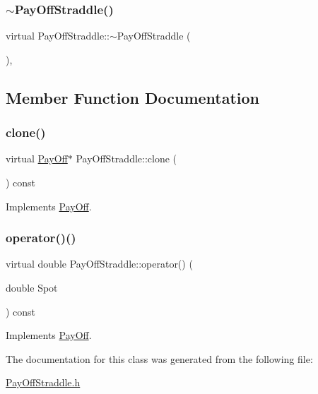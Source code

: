 \subsubsection{\texorpdfstring{$\sim$\+Pay\+Off\+Straddle()}{~PayOffStraddle()}}
{\footnotesize\ttfamily virtual Pay\+Off\+Straddle\+::$\sim$\+Pay\+Off\+Straddle (\begin{DoxyParamCaption}{ }\end{DoxyParamCaption})\hspace{0.3cm}{\ttfamily [inline]}, {\ttfamily [virtual]}}



\subsection{Member Function Documentation}
\hypertarget{classPayOffStraddle_a7909db1ef33e12454c02d289d39f667a}{}\label{classPayOffStraddle_a7909db1ef33e12454c02d289d39f667a} 
\subsubsection{\texorpdfstring{clone()}{clone()}}
{\footnotesize\ttfamily virtual \hyperlink{classPayOff}{Pay\+Off}$\ast$ Pay\+Off\+Straddle\+::clone (\begin{DoxyParamCaption}{ }\end{DoxyParamCaption}) const\hspace{0.3cm}{\ttfamily [virtual]}}



Implements \hyperlink{classPayOff_ad8194d5b82247ae89c25c515f0ba806a}{Pay\+Off}.

\hypertarget{classPayOffStraddle_a28143540c0f8f858d8c00aaea188f4c1}{}\label{classPayOffStraddle_a28143540c0f8f858d8c00aaea188f4c1} 
\subsubsection{\texorpdfstring{operator()()}{operator()()}}
{\footnotesize\ttfamily virtual double Pay\+Off\+Straddle\+::operator() (\begin{DoxyParamCaption}\item[{double}]{Spot }\end{DoxyParamCaption}) const\hspace{0.3cm}{\ttfamily [virtual]}}



Implements \hyperlink{classPayOff_a5ae17d82c233ef5568c8fb0539703000}{Pay\+Off}.



The documentation for this class was generated from the following file\+:\begin{DoxyCompactItemize}
\item 
\hyperlink{PayOffStraddle_8h}{Pay\+Off\+Straddle.\+h}\end{DoxyCompactItemize}
